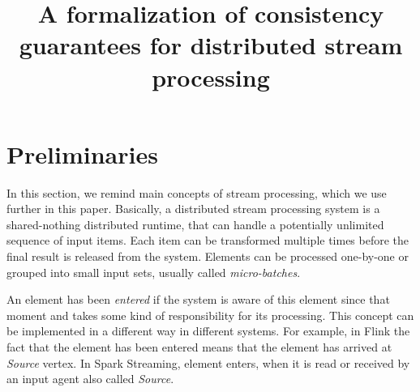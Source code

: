 \documentclass[sigconf]{acmart}
\theoremstyle{definition}
\begin{document}
\title {A formalization of consistency guarantees for distributed stream processing}



\maketitle

\section{Preliminaries}

In this section, we remind main concepts of stream processing, which we use further in this paper. Basically, a distributed stream processing system is a shared-nothing distributed runtime, that can handle a potentially unlimited sequence of input items. Each item can be transformed multiple times before the final result is released from the system. Elements can be processed one-by-one or grouped into small input sets, usually called {\em micro-batches}. 

An element has been {\em entered} if the system is aware of this element since that moment and takes some kind of responsibility for its processing. This concept can be implemented in a different way in different systems. For example, in Flink the fact that the element has been entered means that the element has arrived at {\em Source} vertex. In Spark Streaming, element enters, when it is read or received by an input agent also called {\em Source}. 
\end{document}
